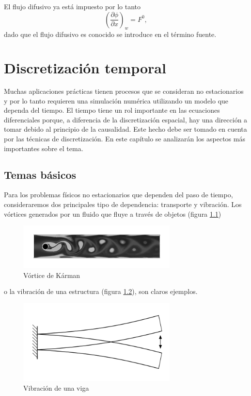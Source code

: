 \documentclass[a4paper,10pt, oneside]{book}
\begin{document}
El flujo difusivo ya está impuesto por lo tanto
\begin{equation}
	\left(\frac{\partial \phi}{\partial x} \right)_w = F^0, \nonumber
\end{equation}
dado que el flujo difusivo es conocido se introduce en el término fuente.

\chapter{Discretización temporal}

Muchas aplicaciones prácticas tienen procesos que se consideran no estacionarios y por lo tanto requieren una simulación numérica utilizando un modelo que dependa del tiempo. El tiempo tiene un rol importante en las ecuaciones diferenciales porque, a diferencia de la discretización espacial, hay una dirección a tomar debido al principio de la causalidad. Este hecho debe ser tomado en cuenta por las técnicas de discretización. En este capítulo se analizarán los aspectos más importantes sobre el tema.

\section{Temas básicos}

Para los problemas físicos no estacionarios que dependen del paso de tiempo, consideraremos dos principales tipo de dependencia: transporte y vibración. Los vórtices generados por un fluido que fluye a través de objetos (figura \ref{img:5-1}) 
\begin{figure}[h!]
	\centering
	\includegraphics[width=8cm]{Img/5-1}
	\caption{Vórtice de Kárman}
	\label{img:5-1}
\end{figure}
o la vibración de una estructura (figura \ref{img:5-2}), son claros ejemplos.
\begin{figure}[h!]
	\centering
	\includegraphics[width=8cm]{Img/5-2}
	\caption{Vibración de una viga}
	\label{img:5-2}
\end{figure}
\end{document}
